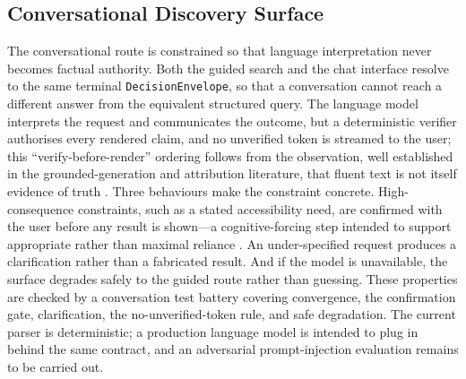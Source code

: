 \subsection{Conversational Discovery Surface}
\label{sec:chat}
The conversational route is constrained so that language interpretation never becomes factual authority.
Both the guided search and the chat interface resolve to the same terminal \texttt{DecisionEnvelope}, so
that a conversation cannot reach a different answer from the equivalent structured query. The language
model interprets the request and communicates the outcome, but a deterministic verifier authorises every
rendered claim, and no unverified token is streamed to the user; this ``verify-before-render'' ordering
follows from the observation, well established in the grounded-generation and attribution literature,
that fluent text is not itself evidence of truth \cite{groundedgen, attribution}. Three behaviours make
the constraint concrete. High-consequence constraints, such as a stated accessibility need, are
confirmed with the user before any result is shown---a cognitive-forcing step intended to support
appropriate rather than maximal reliance \cite{bucinca2021}. An under-specified request produces a
clarification rather than a fabricated result. And if the model is unavailable, the surface degrades
safely to the guided route rather than guessing. These properties are checked by a conversation test
battery covering convergence, the confirmation gate, clarification, the no-unverified-token rule, and
safe degradation. The current parser is deterministic; a production language model is intended to plug in
behind the same contract, and an adversarial prompt-injection evaluation remains to be carried out.


